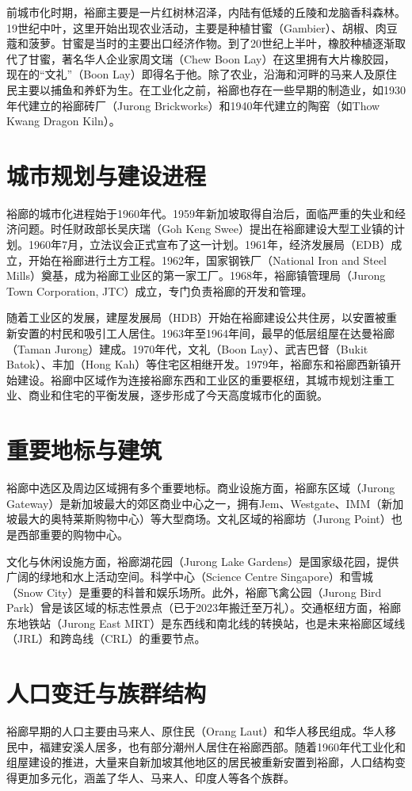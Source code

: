 \documentclass[11pt,a4paper,twoside,openany]{book}
\begin{document}
前城市化时期，裕廊主要是一片红树林沼泽，内陆有低矮的丘陵和龙脑香科森林。19世纪中叶，这里开始出现农业活动，主要是种植甘蜜（Gambier）、胡椒、肉豆蔻和菠萝。甘蜜是当时的主要出口经济作物。到了20世纪上半叶，橡胶种植逐渐取代了甘蜜，著名华人企业家周文瑞（Chew Boon Lay）在这里拥有大片橡胶园，现在的“文礼”（Boon Lay）即得名于他。除了农业，沿海和河畔的马来人及原住民主要以捕鱼和养虾为生。在工业化之前，裕廊也存在一些早期的制造业，如1930年代建立的裕廊砖厂（Jurong Brickworks）和1940年代建立的陶窑（如Thow Kwang Dragon Kiln）。

\section{城市规划与建设进程}
裕廊的城市化进程始于1960年代。1959年新加坡取得自治后，面临严重的失业和经济问题。时任财政部长吴庆瑞（Goh Keng Swee）提出在裕廊建设大型工业镇的计划。1960年7月，立法议会正式宣布了这一计划。1961年，经济发展局（EDB）成立，开始在裕廊进行土方工程。1962年，国家钢铁厂（National Iron and Steel Mills）奠基，成为裕廊工业区的第一家工厂。1968年，裕廊镇管理局（Jurong Town Corporation, JTC）成立，专门负责裕廊的开发和管理。

随着工业区的发展，建屋发展局（HDB）开始在裕廊建设公共住房，以安置被重新安置的村民和吸引工人居住。1963年至1964年间，最早的低层组屋在达曼裕廊（Taman Jurong）建成。1970年代，文礼（Boon Lay）、武吉巴督（Bukit Batok）、丰加（Hong Kah）等住宅区相继开发。1979年，裕廊东和裕廊西新镇开始建设。裕廊中区域作为连接裕廊东西和工业区的重要枢纽，其城市规划注重工业、商业和住宅的平衡发展，逐步形成了今天高度城市化的面貌。

\section{重要地标与建筑}
裕廊中选区及周边区域拥有多个重要地标。商业设施方面，裕廊东区域（Jurong Gateway）是新加坡最大的郊区商业中心之一，拥有Jem、Westgate、IMM（新加坡最大的奥特莱斯购物中心）等大型商场。文礼区域的裕廊坊（Jurong Point）也是西部重要的购物中心。

文化与休闲设施方面，裕廊湖花园（Jurong Lake Gardens）是国家级花园，提供广阔的绿地和水上活动空间。科学中心（Science Centre Singapore）和雪城（Snow City）是重要的科普和娱乐场所。此外，裕廊飞禽公园（Jurong Bird Park）曾是该区域的标志性景点（已于2023年搬迁至万礼）。交通枢纽方面，裕廊东地铁站（Jurong East MRT）是东西线和南北线的转换站，也是未来裕廊区域线（JRL）和跨岛线（CRL）的重要节点。

\section{人口变迁与族群结构}
裕廊早期的人口主要由马来人、原住民（Orang Laut）和华人移民组成。华人移民中，福建安溪人居多，也有部分潮州人居住在裕廊西部。随着1960年代工业化和组屋建设的推进，大量来自新加坡其他地区的居民被重新安置到裕廊，人口结构变得更加多元化，涵盖了华人、马来人、印度人等各个族群。
\end{document}
